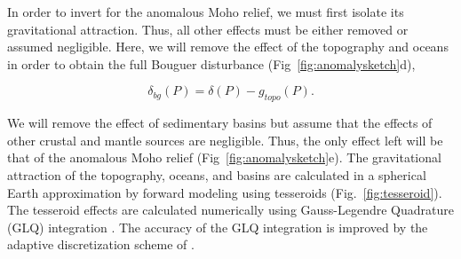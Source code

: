 \documentclass[extra,mreferee]{gji}
\begin{document}
In order to invert for the anomalous Moho relief,
we must first isolate its gravitational attraction.
Thus, all other effects
must be either removed or assumed negligible.
Here, we will remove the effect of the topography and oceans
in order to obtain the full Bouguer disturbance
(Fig~\ref{fig:anomalysketch}d),

\begin{equation}
    \delta_{bg}(P) = \delta(P) - g_{topo}(P).
    \label{eq:bouguer}
\end{equation}

\noindent
We will remove the effect of sedimentary basins
but assume that the effects of
other crustal and mantle sources are negligible.
Thus, the only effect left will be that of the anomalous Moho relief
(Fig~\ref{fig:anomalysketch}e).
The gravitational attraction of the topography, oceans, and basins are
calculated in a spherical Earth approximation by forward modeling using
tesseroids (Fig.~\ref{fig:tesseroid}).
The tesseroid effects are calculated numerically using
Gauss-Legendre Quadrature (GLQ) integration \citep{asgharzadeh2007}.
The accuracy of the GLQ integration is improved by the adaptive discretization
scheme of \citet{uieda2016}.
\end{document}
